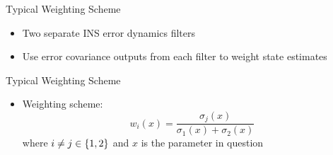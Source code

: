 \begin{frame}
Typical Weighting Scheme
 \begin{itemize}
 \item Two separate INS error dynamics filters
 \item Use error covariance outputs from each filter to weight state estimates
\end{itemize}
\end{frame}

\begin{frame}
Typical Weighting Scheme
 \begin{itemize}
 \item Weighting scheme:
\[w_i(x)=\dfrac{\sigma_j(x)}{\sigma_1(x)+\sigma_2(x)}\]
where $i\neq j\in\left\{1,2\right\}$ and $x$ is the parameter in question
\end{itemize}
\end{frame}
